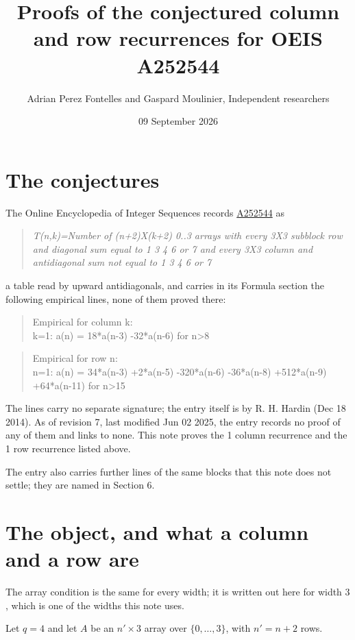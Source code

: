 \documentclass[11pt]{article}
\title{Proofs of the conjectured column and row recurrences for OEIS A252544}
\author{Adrian Perez Fontelles and Gaspard Moulinier, Independent researchers}
\date{09 September 2026}
\theoremstyle{definition}
\begin{document}
\maketitle
\section{The conjectures}

The Online Encyclopedia of Integer Sequences records \href{https://oeis.org/A252544}{A252544} as

\begin{quote}\itshape T(n,k)=Number of (n+2)X(k+2) 0..3 arrays with every 3X3 subblock row and diagonal sum equal to 1 3 4 6 or 7 and every 3X3 column and antidiagonal sum not equal to 1 3 4 6 or 7\end{quote}

a table read by upward antidiagonals, and carries in its Formula section the following empirical lines, none of them proved there:

\begin{quote}\ttfamily Empirical for column k:\\
k=1: a(n) = 18*a(n-3) -32*a(n-6) for n>8\end{quote}

\begin{quote}\ttfamily Empirical for row n:\\
n=1: a(n) = 34*a(n-3) +2*a(n-5) -320*a(n-6) -36*a(n-8) +512*a(n-9) +64*a(n-11) for n>15\end{quote}

The lines carry no separate signature; the entry itself is by R. H. Hardin (Dec 18 2014). As of revision 7, last modified Jun 02 2025, the entry records no proof of any of them and links to none. This note proves the 1 column recurrence and the 1 row recurrence listed above.

The entry also carries further lines of the same blocks that this note does not settle; they are named in Section 6.

\section{The object, and what a column and a row are}

The array condition is the same for every width; it is written out here for width $3$, which is one of the widths this note uses.

Let $q = 4$ and let $A$ be an $n' \times 3$ array over $\{0,\dots,3\}$, with $n' = n + 2$ rows.
\end{document}
